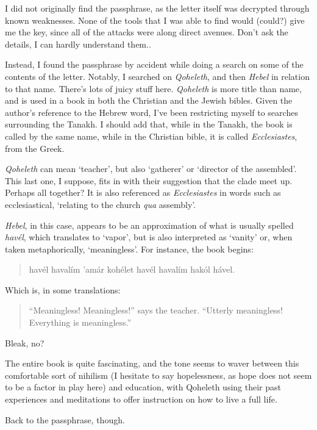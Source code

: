 I did not originally find the passphrase, as the letter itself was decrypted through known weaknesses. None of the tools that I was able to find would (could?) give me the key, since all of the attacks were along direct avenues. Don't ask the details, I can hardly understand them..

Instead, I found the passphrase by accident while doing a search on some of the contents of the letter. Notably, I searched on \emph{Qoheleth}, and then \emph{Hebel} in relation to that name. There's lots of juicy stuff here. \emph{Qoheleth} is more title than name, and is used in a book in both the Christian and the Jewish bibles. Given the author's reference to the Hebrew word, I've been restricting myself to searches surrounding the Tanakh. I should add that, while in the Tanakh, the book is called by the same name, while in the Christian bible, it is called \emph{Ecclesiastes}, from the Greek.

\emph{Qoheleth} can mean `teacher', but also `gatherer' or `director of the assembled'. This last one, I suppose, fits in with their suggestion that the clade meet up. Perhaps all together? It is also referenced as \emph{Ecclesiastes} in words such as ecclesiastical, `relating to the church \emph{qua} assembly'.

\emph{Hebel}, in this case, appears to be an approximation of what is usually spelled \emph{havél}, which translates to `vapor', but is also interpreted as `vanity' or, when taken metaphorically, `meaningless'. For instance, the book begins:

\begin{quote}
havél havalím 'amár kohélet havél havalím hakól hável.
\end{quote}

Which is, in some translations:

\begin{quote}
``Meaningless! Meaningless!'' says the teacher. ``Utterly meaningless! Everything is meaningless.''
\end{quote}

Bleak, no?

The entire book is quite fascinating, and the tone seems to waver between this comfortable sort of nihilism (I hesitate to say hopelessness, as hope does not seem to be a factor in play here) and education, with Qoheleth using their past experiences and meditations to offer instruction on how to live a full life.

Back to the passphrase, though.


